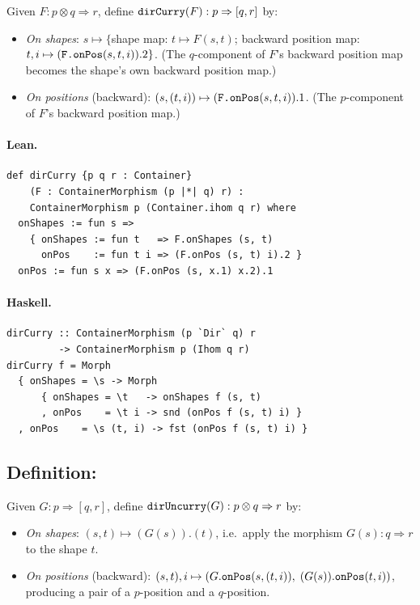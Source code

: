 \documentclass[11pt,a4paper]{article}
\begin{document}
\begin{defn}[Currying]
Given $F : p \otimes q \Rightarrow r$, define
$\texttt{dirCurry}(F) : p \Rightarrow [q, r]$ by:
\begin{itemize}
  \item \emph{On shapes}: $s \mapsto \{$shape map: $t \mapsto F(s,t)$;
    backward position map: $t, i \mapsto (\texttt{F.onPos}(s,t,i)).2\}$.
    (The $q$-component of $F$'s backward position map becomes the shape's own
    backward position map.)
  \item \emph{On positions} (backward): $(s, (t, i)) \mapsto
    (\texttt{F.onPos}(s,t,i)).1$.
    (The $p$-component of $F$'s backward position map.)
\end{itemize}
\end{defn}

\paragraph{Lean.}
\begin{lstlisting}[style=lean]
def dirCurry {p q r : Container}
    (F : ContainerMorphism (p |*| q) r) :
    ContainerMorphism p (Container.ihom q r) where
  onShapes := fun s =>
    { onShapes := fun t   => F.onShapes (s, t)
      onPos    := fun t i => (F.onPos (s, t) i).2 }
  onPos := fun s x => (F.onPos (s, x.1) x.2).1
\end{lstlisting}

\paragraph{Haskell.}
\begin{lstlisting}[style=haskell]
dirCurry :: ContainerMorphism (p `Dir` q) r
         -> ContainerMorphism p (Ihom q r)
dirCurry f = Morph
  { onShapes = \s -> Morph
      { onShapes = \t   -> onShapes f (s, t)
      , onPos    = \t i -> snd (onPos f (s, t) i) }
  , onPos    = \s (t, i) -> fst (onPos f (s, t) i) }
\end{lstlisting}


\subsection{Definition: }

\begin{defn}[Uncurrying]
Given $G : p \Rightarrow [q, r]$, define
$\texttt{dirUncurry}(G) : p \otimes q \Rightarrow r$ by:
\begin{itemize}
  \item \emph{On shapes}: $(s, t) \mapsto (G(s)).(t)$, i.e.\ apply the
    morphism $G(s) : q \Rightarrow r$ to the shape $t$.
  \item \emph{On positions} (backward): $(s,t), i \mapsto
    (G.\texttt{onPos}(s, (t, i)),\;(G(s)).\texttt{onPos}(t, i))$,
    producing a pair of a $p$-position and a $q$-position.
\end{itemize}
\end{defn}
\end{document}
